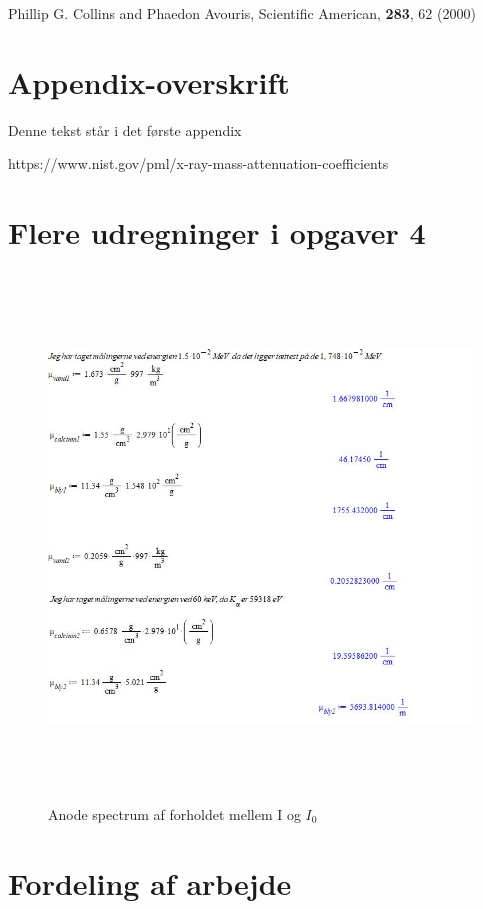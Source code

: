 \documentclass[a4paper,twoside]{article}
\begin{document}
\begin{thebibliography}{} %
Phillip G. Collins and Phaedon Avouris, Scientific American, \textbf{283}, 62 (2000)
\end{thebibliography}

\newpage 

\appendix
\section{Appendix-overskrift}
Denne tekst står i det første appendix

https://www.nist.gov/pml/x-ray-mass-attenuation-coefficients


\section{Flere udregninger i opgaver 4}
\begin{figure}[H]
\begin{centering}
\includegraphics[height=14cm]{Opgave 4.jpg}
\hspace{1cm}
\par\end{centering}
\caption{\label{cap:2ien} Anode spectrum af forholdet mellem I og $I_0$ }
\end{figure}




\section{Fordeling af arbejde}
\end{document}
